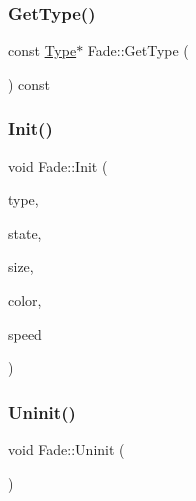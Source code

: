 \subsubsection{\texorpdfstring{Get\+Type()}{GetType()}}
{\footnotesize\ttfamily const \mbox{\hyperlink{class_fade_ac06f27215b454aa05b93c236476d6e80}{Type}}$\ast$ Fade\+::\+Get\+Type (\begin{DoxyParamCaption}{ }\end{DoxyParamCaption}) const\hspace{0.3cm}{\ttfamily [inline]}}

\mbox{\label{class_fade_aab12848f7102a219968c86ed699a6e5d}} 
\subsubsection{\texorpdfstring{Init()}{Init()}}
{\footnotesize\ttfamily void Fade\+::\+Init (\begin{DoxyParamCaption}\item[{\mbox{\hyperlink{class_fade_ac06f27215b454aa05b93c236476d6e80}{Type}}}]{type,  }\item[{\mbox{\hyperlink{class_fade_ae77826bf3ff2ab95fb7b3b6f95cba80a}{State}}}]{state,  }\item[{\mbox{\hyperlink{_vector3_d_8h_a5ef6e95dfc5f9d3820b71772d99bbc25}{Vec2}}}]{size,  }\item[{\mbox{\hyperlink{_vector3_d_8h_a680c30c4a07d86fe763c7e01169cd6cc}{X\+Color4}}}]{color,  }\item[{float}]{speed }\end{DoxyParamCaption})}

\mbox{\label{class_fade_abf68444af1314ad502d1109940b2ab5c}} 
\subsubsection{\texorpdfstring{Uninit()}{Uninit()}}
{\footnotesize\ttfamily void Fade\+::\+Uninit (\begin{DoxyParamCaption}{ }\end{DoxyParamCaption})}

\mbox{\label{class_fade_a1579b5b9020344a1131ea11c15f2c0bd}} 
